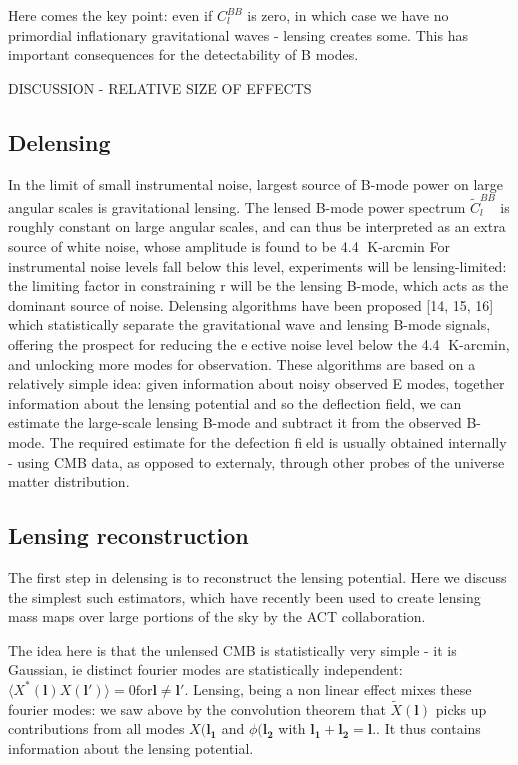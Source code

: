 \documentclass[a4paper,11pt]{article}
\renewcommand{\v}[1]{\mathbf{#1}}
\begin{document}
Here comes the key point: even if $C_{l}^{BB}$ is zero, in which case we have no primordial inflationary gravitational waves - lensing creates some. This has important consequences for the detectability of B modes.

DISCUSSION - RELATIVE SIZE OF EFFECTS

\subsection{Delensing}

In the limit of small instrumental noise, largest source of B-mode power on large angular scales is gravitational lensing. The lensed B-mode power spectrum $\tilde{C}^{BB}_l$ is roughly constant on large angular scales, and can thus be interpreted as an extra source of white noise, whose amplitude is found to be 4.4 K-arcmin For instrumental noise levels fall below this level, experiments will be lensing-limited: the limiting factor in constraining r will be the lensing B-mode, which acts as the dominant source of noise. Delensing algorithms have been proposed [14, 15, 16] which statistically separate the gravitational wave and lensing B-mode signals, offering the prospect for reducing the eective noise level below the 4.4 K-arcmin, and unlocking more modes for observation. These algorithms are based on a relatively simple idea: given information about noisy observed E modes, together information about the lensing potential and so the deflection field, we can estimate the large-scale lensing B-mode and subtract it from
the observed B-mode. The required estimate for the defection field is usually obtained internally - using CMB data, as opposed to externaly, through other probes of the universe matter distribution.

\subsection{Lensing reconstruction}

The first step in delensing is to reconstruct the lensing potential. Here we discuss the simplest such estimators, which have recently been used to create lensing mass maps over large portions of the sky by the ACT collaboration. 

The idea here is that the unlensed CMB is statistically very simple - it is Gaussian, ie distinct fourier modes are statistically independent: $\langle X^*(\v{l})X(\v{l'})\rangle =0 \text{for} \v{l} \neq \v{l'}$. Lensing, being a non linear effect mixes these fourier modes: we saw above by the convolution theorem that  $\tilde{X}(\v{l})$ picks up contributions from all modes ${X}(\v{l_1}$ and $\phi(\v{l_2}$ with $\v{l_1}+\v{l_2}=\v{l}$.. It thus contains information about the lensing potential.
\end{document}
